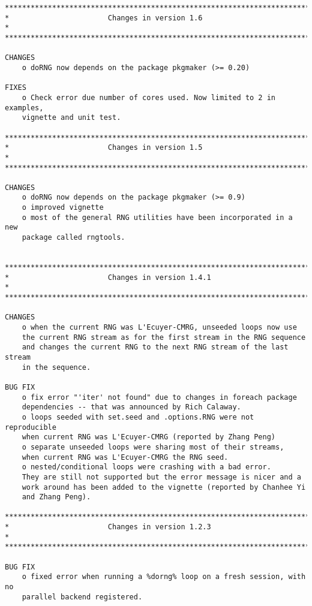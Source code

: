 \documentclass[a4paper,12pt]{article}\usepackage[]{graphicx}\usepackage[]{color}
\begin{document}
{\scriptsize
\begin{verbatim}
*************************************************************************
*                       Changes in version 1.6                          *
*************************************************************************

CHANGES
    o doRNG now depends on the package pkgmaker (>= 0.20)
    
FIXES
    o Check error due number of cores used. Now limited to 2 in examples,
    vignette and unit test.

*************************************************************************
*                       Changes in version 1.5                          *
*************************************************************************

CHANGES
    o doRNG now depends on the package pkgmaker (>= 0.9)
    o improved vignette
    o most of the general RNG utilities have been incorporated in a new
    package called rngtools.
    

*************************************************************************
*                       Changes in version 1.4.1                        *
*************************************************************************

CHANGES
    o when the current RNG was L'Ecuyer-CMRG, unseeded loops now use 
    the current RNG stream as for the first stream in the RNG sequence 
    and changes the current RNG to the next RNG stream of the last stream 
    in the sequence. 

BUG FIX
    o fix error "'iter' not found" due to changes in foreach package 
    dependencies -- that was announced by Rich Calaway.
    o loops seeded with set.seed and .options.RNG were not reproducible
    when current RNG was L'Ecuyer-CMRG (reported by Zhang Peng)
    o separate unseeded loops were sharing most of their streams, 
    when current RNG was L'Ecuyer-CMRG the RNG seed.
    o nested/conditional loops were crashing with a bad error. 
    They are still not supported but the error message is nicer and a 
    work around has been added to the vignette (reported by Chanhee Yi 
    and Zhang Peng).

*************************************************************************
*                       Changes in version 1.2.3                        *
*************************************************************************

BUG FIX
    o fixed error when running a %dorng% loop on a fresh session, with no  
    parallel backend registered.  


\end{verbatim}}
\end{document}
